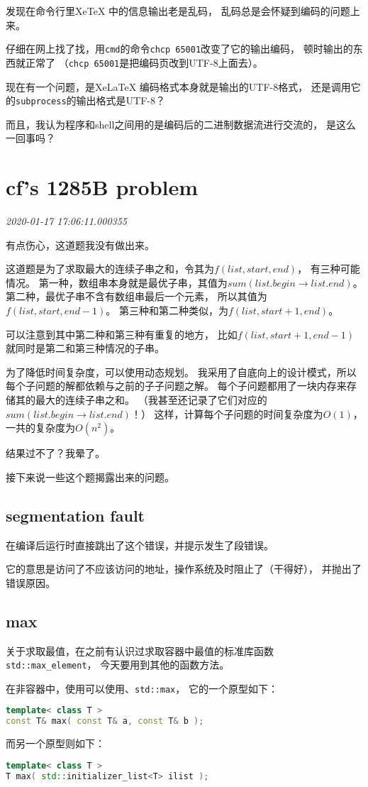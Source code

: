 \documentclass{peterlitsdoc}
\newcommand{\timetx}[1]
    {\par\noindent\emph{\pltgray\small #1}\vspace{2em}}
\newcommand{\vb}{\verb}
\begin{document}
发现在命令行里XeTeX 中的信息输出老是乱码，
乱码总是会怀疑到编码的问题上来。

仔细在网上找了找，用\vb|cmd|的命令\vb|chcp 65001|改变了它的输出编码，
顿时输出的东西就正常了
（\vb|chcp 65001|是把编码页改到UTF-8上面去）。

现在有一个问题，是XeLaTeX 编码格式本身就是输出的UTF-8格式，
还是调用它的\vb|subprocess|的输出格式是UTF-8？

而且，我认为程序和shell之间用的是编码后的二进制数据流进行交流的，
是这么一回事吗？


\section{cf's 1285B problem}\timetx{2020-01-17 17:06:11.000355}

有点伤心，这道题我没有做出来。

这道题是为了求取最大的连续子串之和，令其为$f(list, start, end)$，
有三种可能情况。
第一种，数组串本身就是最优子串，其值为$sum(list.begin\to list.end)$。
第二种，最优子串不含有数组串最后一个元素，
所以其值为$f(list, start, end-1)$。
第三种和第二种类似，为$f(list, start+1, end)$。

可以注意到其中第二种和第三种有重复的地方，
比如$f(list, start+1, end-1)$就同时是第二和第三种情况的子串。

为了降低时间复杂度，可以使用动态规划。
我采用了自底向上的设计模式，所以每个子问题的解都依赖与之前的子子问题之解。
每个子问题都用了一块内存来存储其的最大的连续子串之和。
（我甚至还记录了它们对应的$sum(list.begin\to list.end)$！）
这样，计算每个子问题的时间复杂度为$O(1)$，
一共的复杂度为$O(n^2)$。

结果过不了？我晕了。

接下来说一些这个题揭露出来的问题。

\subsection{segmentation fault}
在编译后运行时直接跳出了这个错误，并提示发生了段错误。

它的意思是访问了不应该访问的地址，操作系统及时阻止了（干得好），
并抛出了错误原因。

\subsection{max}
关于求取最值，在之前有认识过求取容器中最值的标准库函数\vb|std::max_element|，
今天要用到其他的函数方法。

在非容器中，使用可以使用、\vb|std::max|，
它的一个原型如下：
\begin{lstlisting}[language=C++]
template< class T >
const T& max( const T& a, const T& b );
\end{lstlisting}
而另一个原型则如下：
\begin{lstlisting}[language=C++]
template< class T >
T max( std::initializer_list<T> ilist );
\end{lstlisting}
\end{document}

